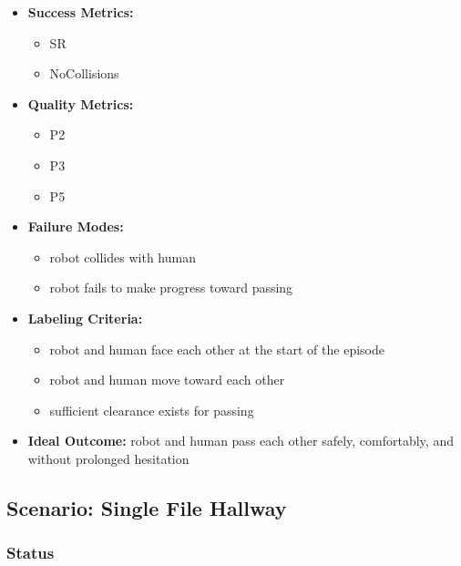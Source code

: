\documentclass[utf8]{frontiers_suppmat} %
\providecommand{\tightlist}{%
  \setlength{\itemsep}{0pt}\setlength{\parskip}{0pt}}
\begin{document}
\begin{itemize}
\tightlist
\item
  \textbf{Success Metrics:}

  \begin{itemize}
  \tightlist
  \item
    SR
  \item
    NoCollisions
  \end{itemize}
\item
  \textbf{Quality Metrics:}

  \begin{itemize}
  \tightlist
  \item
    P2
  \item
    P3
  \item
    P5
  \end{itemize}
\item
  \textbf{Failure Modes:}

  \begin{itemize}
  \tightlist
  \item
    robot collides with human
  \item
    robot fails to make progress toward passing
  \end{itemize}
\item
  \textbf{Labeling Criteria:}

  \begin{itemize}
  \tightlist
  \item
    robot and human face each other at the start of the episode
  \item
    robot and human move toward each other
  \item
    sufficient clearance exists for passing
  \end{itemize}
\item
  \textbf{Ideal Outcome:} robot and human pass each other safely,
  comfortably, and without prolonged hesitation
\end{itemize}


\subsection{Scenario: Single File
Hallway}\label{scenario-single-file-hallway}

\subsubsection{Status}\label{status}
\end{document}
